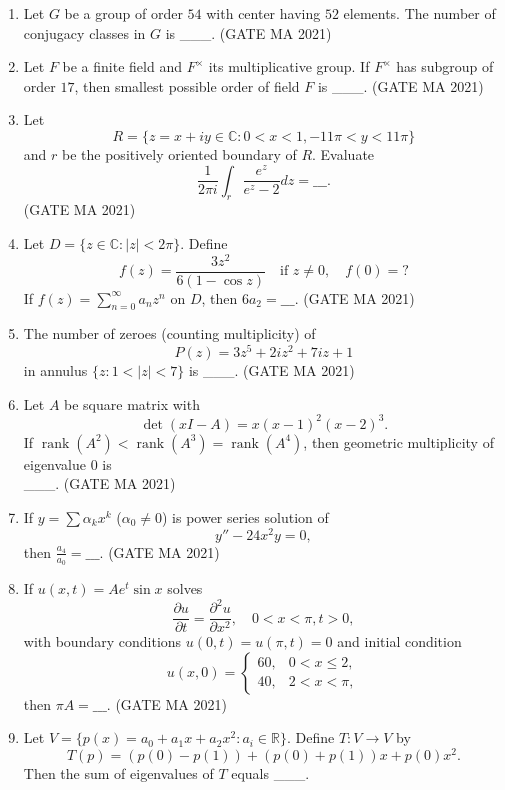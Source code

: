 \documentclass[journal,12pt,onecolumn]{IEEEtran}
\theoremstyle{remark}
\begin{document}
\begin{enumerate}
    \item Let $G$ be a group of order $54$ with center having $52$ elements. The number of conjugacy classes in $G$ is \_\_\_.
\hfill(GATE MA 2021)
    \item Let $F$ be a finite field and $F^\times$ its multiplicative group. If $F^\times$ has subgroup of order $17$, then smallest possible order of field $F$ is \_\_\_.
\hfill(GATE MA 2021)
    \item Let
    $$
    R = \{ z = x + iy \in \mathbb{C} : 0 < x < 1, -11\pi < y < 11 \pi \}
    $$
    and $r$ be the positively oriented boundary of $R$. Evaluate
    $$
    \frac{1}{2 \pi i} \int_r \frac{e^z}{e^z - 2} dz = \_\_\_.
    $$
\hfill(GATE MA 2021)
    \item Let $D = \{z \in \mathbb{C} : |z| < 2\pi \}$. Define
    $$
    f(z) = \frac{3 z^2}{6(1-\cos z)} \quad \text{if } z \neq 0, \quad f(0) = ?
    $$
    If $f(z) = \sum_{n=0}^\infty a_n z^n$ on $D$, then $6 a_2 = \_\_\_$.
\hfill(GATE MA 2021)
    \item The number of zeroes (counting multiplicity) of
    $$
    P(z) = 3 z^5 + 2i z^2 + 7 i z + 1
    $$
    in annulus $\{ z : 1 < |z| < 7 \}$ is \_\_\_.
\hfill(GATE MA 2021)
    \item Let $A$ be square matrix with
    $$
    \det(xI - A) = x (x-1)^2 (x-2)^3.
    $$
    If $\operatorname{rank}(A^2) < \operatorname{rank}(A^3) = \operatorname{rank}(A^4)$, then geometric multiplicity of eigenvalue 0 is \\ \_\_\_.
\hfill(GATE MA 2021)
    \item If $y = \sum \alpha_k x^k$ ($\alpha_0 \neq 0$) is power series solution of
    $$
    y'' - 24 x^2 y = 0,
    $$
    then $\frac{a_4}{a_0} = \_\_\_$.
\hfill(GATE MA 2021)
    \item If $u(x,t) = A e^{t} \sin x$ solves
    $$
    \frac{\partial u}{\partial t} = \frac{\partial^2 u}{\partial x^2}, \quad 0 < x < \pi, t>0,
    $$
    with boundary conditions $u(0,t) = u(\pi,t) = 0$ and initial condition
    $$
    u(x,0) = \begin{cases}
    60, & 0 < x \leq 2, \\
    40, & 2 < x < \pi,
    \end{cases}
    $$
    then $\pi A = \_\_\_$.
\hfill(GATE MA 2021)
    \item Let $V = \{ p(x) = a_0 + a_1 x + a_2 x^2 : a_i \in \mathbb{R} \}$. Define $T: V \to V$ by
    $$
    T(p) = (p(0) - p(1)) + (p(0) + p(1)) x + p(0) x^2.
    $$
    Then the sum of eigenvalues of $T$ equals \_\_\_.

\end{enumerate}
\end{document}
